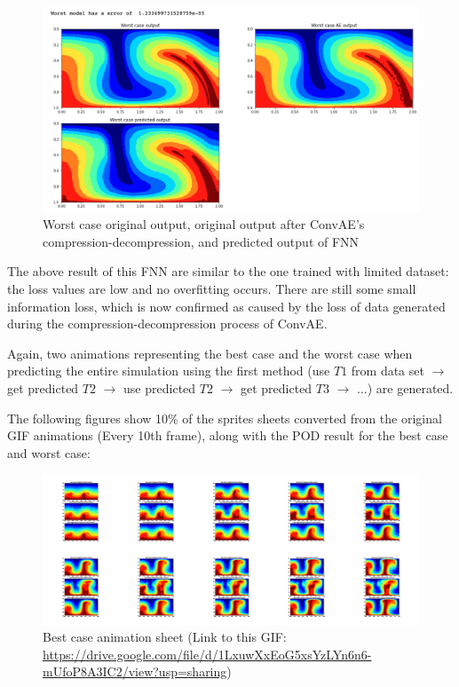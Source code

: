 \begin{figure}[H]
    \caption{Worst case original output, original output after ConvAE's compression-decompression, and predicted output of FNN}
    \includegraphics[scale=0.5]{Report LaTeX/figures/mantle_convection_images/larger_dataset/FNN_Worst.png}
\end{figure}

The above result of this FNN are similar to the one trained with limited dataset: the loss values are low and no overfitting occurs. There are still some small information loss, which is now confirmed as caused by the loss of data generated during the compression-decompression process of ConvAE.

Again, two animations representing the best case and the worst case when predicting the entire simulation using the first method (use $T1$ from data set $\rightarrow$ get predicted $T2$ $\rightarrow$ use predicted $T2$ $\rightarrow$ get predicted $T3$ $\rightarrow$ ...) are generated.

The following figures show 10\% of the sprites sheets converted from the original GIF animations (Every 10th frame), along with the POD result for the best case and worst case:

\begin{figure}[H]
    \centering
    \caption{Best case animation sheet (Link to this GIF: \url{https://drive.google.com/file/d/1LxuwXxEoG5xsYzLYn6n6-mUfoP8A3IC2/view?usp=sharing})}
    \includegraphics[scale=0.10]{Report LaTeX/figures/mantle_convection_images/larger_dataset/FNN_Best_GIF_sheet.png}
\end{figure}

